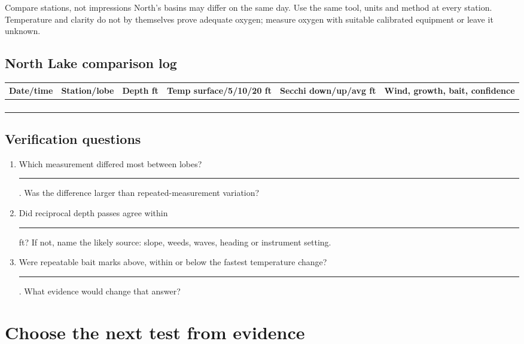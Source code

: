\begin{telospanel}{Compare stations, not impressions}
North's basins may differ on the same day. Use the same tool, units and method
at every station. Temperature and clarity do not by themselves prove adequate
oxygen; measure oxygen with suitable calibrated equipment or leave it unknown.
\end{telospanel}

\subsection{North Lake comparison log}
\renewcommand{\arraystretch}{1.35}
\begin{tabularx}{\linewidth}{@{}p{.11\linewidth}p{.12\linewidth}p{.09\linewidth}
p{.14\linewidth}p{.14\linewidth}X@{}}
\toprule
Date/time & Station/lobe & Depth ft & Temp surface/5/10/20 ft &
Secchi down/up/avg ft & Wind, growth, bait, confidence\\
\midrule
\rule{0pt}{1.05cm}&&&&&\\ \midrule
\rule{0pt}{1.05cm}&&&&&\\ \midrule
\rule{0pt}{1.05cm}&&&&&\\ \midrule
\rule{0pt}{1.05cm}&&&&&\\
\bottomrule
\end{tabularx}
\renewcommand{\arraystretch}{1}

\subsection{Verification questions}
\begin{enumerate}
\item Which measurement differed most between lobes? \rule{1.3in}{.4pt}.
Was the difference larger than repeated-measurement variation?
\item Did reciprocal depth passes agree within \rule{.45in}{.4pt} ft? If not,
name the likely source: slope, weeds, waves, heading or instrument setting.
\item Were repeatable bait marks above, within or below the fastest
temperature change? \rule{1.1in}{.4pt}. What evidence would change that answer?
\end{enumerate}

\newpage
\section{Choose the next test from evidence}

